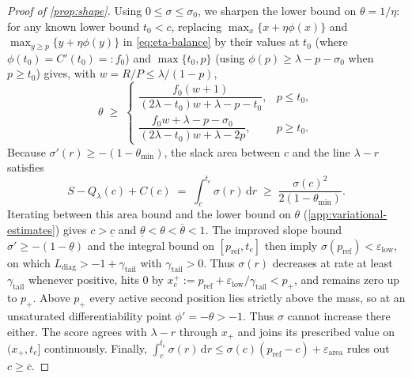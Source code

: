 \documentclass[11pt]{article}
\numberwithin{equation}{section}
\theoremstyle{plain}
\theoremstyle{definition}
\newcommand{\1}{\mathbf{1}}
\begin{document}
\begin{proof}[Proof of {\cref{prop:shape}}]
Using $0 \le \sigma \le \sigma_0$, we sharpen the lower bound on $\theta = 1/\eta$: for any known lower bound $t_0 < c$, replacing $\max_x \{x + \eta\phi(x)\}$ and $\max_{y \ge p} \{y + \eta\phi(y)\}$ in \cref{eq:eta-balance} by their values at $t_0$ (where $\phi(t_0) = C'(t_0) =: f_0$) and $\max\{t_0, p\}$ (using $\phi(p) \ge \lambda - p - \sigma_0$ when $p \ge t_0$) gives, with $w = R/P \le \lambda/(1 - p)$,
\[
  \theta \;\ge\;
  \begin{cases}
    \dfrac{f_0(w + 1)}{(2\lambda - t_0)w + \lambda - p - t_0}, & p \le t_0, \\[10pt]
    \dfrac{f_0 w + \lambda - p - \sigma_0}{(2\lambda - t_0)w + \lambda - 2p}, & p \ge t_0.
  \end{cases}
\]
Because $\sigma'(r) \ge -(1 - \theta_{\min})$, the slack area between $c$ and the line $\lambda - r$ satisfies
\[
  S - Q_\lambda(c) + C(c) \;=\; \int_c^{t_e} \sigma(r)\,\mathrm{d}r \;\ge\; \frac{\sigma(c)^2}{2(1 - \theta_{\min})}.
\]
Iterating between this area bound and the lower bound on $\theta$ (\cref{app:variational-estimates}) gives $c > \underline{c}$ and $\underline{\theta} < \theta < \overline{\theta} < 1$. The improved slope bound $\sigma' \ge -(1 - \underline{\theta})$ and the integral bound on $[p_{\mathrm{ref}}, t_e]$ then imply $\sigma(p_{\mathrm{ref}}) < \varepsilon_{\mathrm{low}}$, on which $L_{\mathrm{diag}} > -1 + \gamma_{\mathrm{tail}}$ with $\gamma_{\mathrm{tail}} > 0$. Thus $\sigma(r)$ decreases at rate at least $\gamma_{\mathrm{tail}}$ whenever positive, hits $0$ by $x_c^+ := p_{\mathrm{ref}} + \varepsilon_{\mathrm{low}}/\gamma_{\mathrm{tail}} < p_+$, and remains zero up to $p_+$. Above $p_+$ every active second position lies strictly above the mass, so at an unsaturated differentiability point $\phi'=-\theta>-1$. Thus $\sigma$ cannot increase there either. The score agrees with $\lambda-r$ through $x_+$ and joins its prescribed value on $(x_+,t_e]$ continuously. Finally, $\int_c^{t_e} \sigma(r)\,\mathrm{d}r \le \sigma(c)(p_{\mathrm{ref}} - c) + \varepsilon_{\mathrm{area}}$ rules out $c \ge \overline{c}$.


\end{proof}
\end{document}

